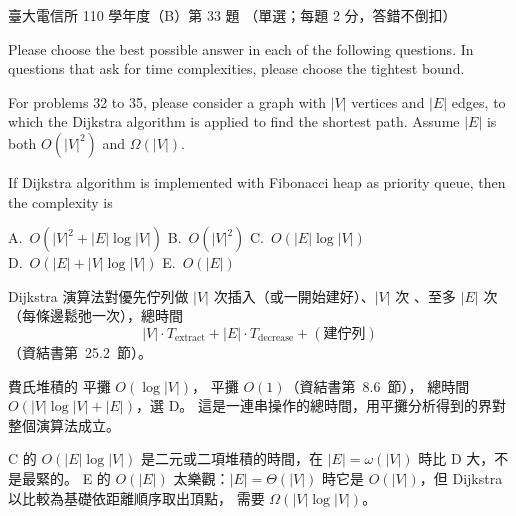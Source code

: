 \begin{pastexam}[label={px:ntu-110-comm-dsa-33}]{臺大電信所 110 學年度（B）第 33 題}
（單選；每題 2 分，答錯不倒扣）

Please choose the best possible answer in each of the following questions. In questions that ask for time complexities, please choose the tightest bound.

For problems 32 to 35, please consider a graph with $|V|$ vertices and $|E|$ edges, to which the Dijkstra algorithm is applied to find the shortest path. Assume $|E|$ is both $O(|V|^2)$ and $\Omega(|V|)$.

If Dijkstra algorithm is implemented with Fibonacci heap as priority queue, then the complexity is

A.~$O(|V|^2+|E|\log|V|)$ \qquad B.~$O(|V|^2)$ \qquad C.~$O(|E|\log|V|)$\\
D.~$O(|E|+|V|\log|V|)$ \qquad E.~$O(|E|)$
\end{pastexam}

\begin{pastsoln}
Dijkstra 演算法對優先佇列做 $|V|$ 次插入（或一開始建好）、$|V|$ 次 、至多 $|E|$ 次
（每條邊鬆弛一次），總時間
\[
|V| \cdot T_{\text{extract}} + |E| \cdot T_{\text{decrease}} + (\text{建佇列})
\]
（資結書第~25.2~節）。

費氏堆積的  平攤 $O(\log|V|)$， 平攤 $O(1)$（資結書第~8.6~節），
總時間 $O(|V|\log|V| + |E|)$，選 D。 這是一連串操作的總時間，用平攤分析得到的界對整個演算法成立。

C 的 $O(|E|\log|V|)$ 是二元或二項堆積的時間，在 $|E| = \omega(|V|)$ 時比 D 大，不是最緊的。
E 的 $O(|E|)$ 太樂觀：$|E| = \Theta(|V|)$ 時它是 $O(|V|)$，但 Dijkstra 以比較為基礎依距離順序取出頂點，
需要 $\Omega(|V|\log|V|)$。
\end{pastsoln}
